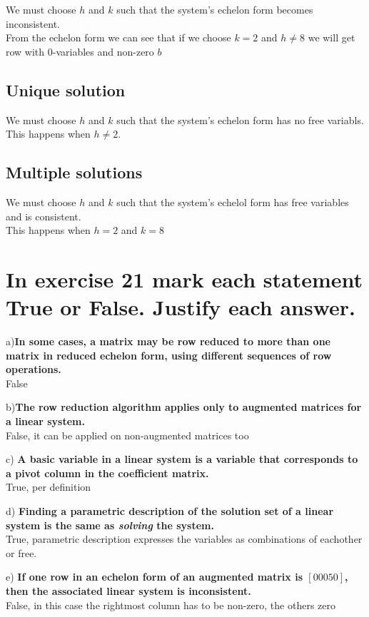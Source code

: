 \documentclass{article}
\begin{document}
We must choose $h$ and $k$ such that the system's echelon form becomes inconsistent.\\
From the echelon form we can see that if we choose $k = 2$ and $h \neq 8$ we will get row with 0-variables and non-zero $b$

\subsection{Unique solution}

We must choose $h$ and $k$ such that the system's echelon form has no free variabls.\\
This happens when $h \neq 2$.

\subsection{Multiple solutions}

We must choose $h$ and $k$ such that the system's echelol form has free variables and is consistent.\\
This happens when $h = 2$ and $k = 8$

\section{In exercise 21 mark each statement True or False. Justify each answer.}

a)\textbf{In some cases, a matrix may be row reduced to more than one matrix in reduced echelon form, using different sequences of row operations.}\\
False

b)\textbf{The row reduction algorithm applies only to augmented matrices for a linear system.}\\
False, it can be applied on non-augmented matrices too

c) \textbf{A basic variable in a linear system is a variable that corresponds to a pivot column in the coefficient matrix.}\\
True, per definition

d) \textbf{Finding a parametric description of the solution set of a linear system is the same as \emph{solving} the system.}\\
True, parametric description expresses the variables as combinations of eachother or free.

e) \textbf{If one row in an echelon form of an augmented matrix is $[0 0 0 5 0]$, then the associated linear system is inconsistent.}\\
False, in this case the rightmost column has to be non-zero, the others zero
 
\end{document}

